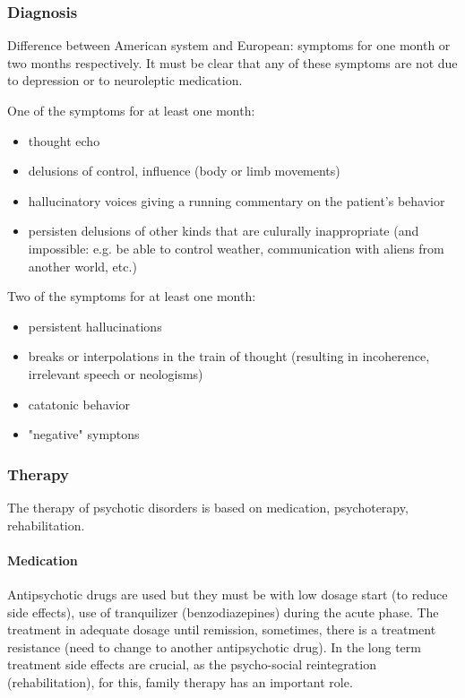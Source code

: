 \documentclass[12pt,article,oneside,a4paper]{memoir}
\begin{document}
\subsubsection{Diagnosis}
Difference between American system and European: symptoms for one month or two
months respectively. It must be clear that any of these symptoms are not due to
depression or to neuroleptic medication.

One of the symptoms for at least one month:
\begin{itemize}
\item thought echo
\item delusions of control, influence (body or limb movements)
\item hallucinatory voices giving a running commentary on the patient's behavior
\item persisten delusions of other kinds that are culurally inappropriate
(and impossible: e.g. be able to control weather, communication with aliens from 
another world, etc.)
\end{itemize}

Two of the symptoms for at least one month:
\begin{itemize}
\item persistent hallucinations
\item breaks or interpolations in the train of thought (resulting in incoherence,
irrelevant speech or neologisms)
\item catatonic behavior
\item "negative" symptons
\end{itemize}

\subsubsection{Therapy}
The therapy of psychotic disorders is based on medication, psychoterapy,
rehabilitation.

\paragraph{Medication}
Antipsychotic drugs are used but they must be with low dosage start (to reduce
side effects), use of tranquilizer (benzodiazepines) during the acute phase. The
treatment in adequate dosage until remission, sometimes, there is a treatment
resistance (need to change to another antipsychotic drug).
In the long term treatment side effects are crucial, as the psycho-social
reintegration (rehabilitation), for this, family therapy has an important role.
\end{document}
